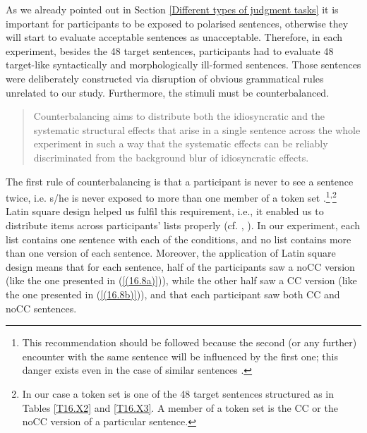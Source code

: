 As we already pointed out in Section \ref{Different types of judgment tasks} it is important for participants to be exposed to polarised sentences, otherwise they will start to evaluate acceptable sentences as unacceptable. Therefore, in each experiment, besides the 48 target sentences, participants had to evaluate 48 target-like syntactically and morphologically ill-formed sentences. Those sentences were deliberately constructed via disruption of obvious grammatical rules unrelated to our study. Furthermore, the stimuli must be counterbalanced. 

\begin{quotation}
Counterbalancing aims to distribute both the idiosyncratic and the systematic structural effects that arise in a single sentence across the whole experiment in such a way that the systematic effects can be reliably discriminated from the background blur of idiosyncratic effects.\hfill \citep[93]{Cowart97}
\end{quotation}

The first rule of counterbalancing is that a participant is never to see a sentence twice, i.e. s/he is never exposed to more than one member of a token set \citep[][50f, 93]{Cowart97}.\footnote{This recommendation should be followed because the second (or any further) encounter with the same sentence will be influenced by the first one; this danger exists even in the case of similar sentences \citep[cf.][50]{Cowart97}.}\textsuperscript{,}\footnote{In our case a token set is one of the 48 target sentences structured as in Tables \ref{T16.X2} and \ref{T16.X3}. A member of a token set is the CC or the noCC version of a particular sentence. } Latin square design helped us fulfil this requirement, i.e., it enabled us to distribute items across participants’ lists properly (cf. \citealt[][49]{StoweKaan06}, \citealt[][121]{AGM13}). In our experiment, each list contains one sentence with each of the conditions, and no list contains more than one version of each sentence. Moreover, the application of Latin square design means that for each sentence, half of the participants saw a noCC version (like the one presented in (\ref{(16.8a)})), while the other half saw a CC version (like the one presented in (\ref{(16.8b)})), and that each participant saw both CC and noCC sentences.

